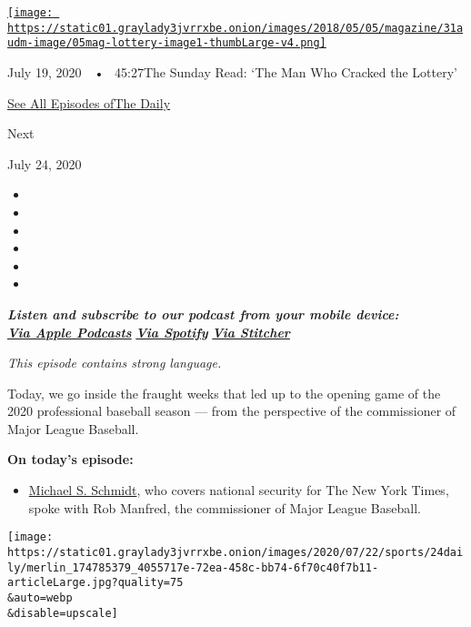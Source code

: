 \href{https://www.nytimes3xbfgragh.onion/2020/07/19/podcasts/the-daily/lottery-winner-scam.html?action=click\&module=audio-series-bar\&region=header\&pgtype=Article}{\texttt{[image: https://static01.graylady3jvrrxbe.onion/images/2018/05/05/magazine/31audm-image/05mag-lottery-image1-thumbLarge-v4.png]}}

July 19, 2020~~•~ 45:27The Sunday Read: `The Man Who Cracked the
Lottery'

\href{https://www.nytimes3xbfgragh.onion/column/the-daily}{See All
Episodes ofThe Daily}

Next

July 24, 2020

\begin{itemize}
\item
\item
\item
\item
\item
\item
\end{itemize}

\emph{\textbf{Listen and subscribe to our podcast from your mobile
device:}}\\
\textbf{\href{https://itunes.apple.com/us/podcast/the-daily/id1200361736?mt=2}{\emph{Via
Apple Podcasts}}} \emph{\textbf{\textbar{}}}
\textbf{\href{https://open.spotify.com/show/3IM0lmZxpFAY7CwMuv9H4g?si=SfuMSC55R1qprFsRZU3_zw}{\emph{Via
Spotify}}} \emph{\textbf{\textbar{}}}
\textbf{\href{http://www.stitcher.com/podcast/the-new-york-times/the-daily-10}{\emph{Via
Stitcher}}}

\emph{This episode contains strong language.}

Today, we go inside the fraught weeks that led up to the opening game of
the 2020 professional baseball season --- from the perspective of the
commissioner of Major League Baseball.

\textbf{On today's episode:}

\begin{itemize}
\tightlist
\item
  \href{https://www.nytimes3xbfgragh.onion/by/michael-s-schmidt?smid=pc-thedaily}{Michael
  S. Schmidt}, who covers national security for The New York Times,
  spoke with Rob Manfred, the commissioner of Major League Baseball.
\end{itemize}

\texttt{[image: https://static01.graylady3jvrrxbe.onion/images/2020/07/22/sports/24daily/merlin\_174785379\_4055717e-72ea-458c-bb74-6f70c40f7b11-articleLarge.jpg?quality=75\\\&auto=webp\\\&disable=upscale]}


